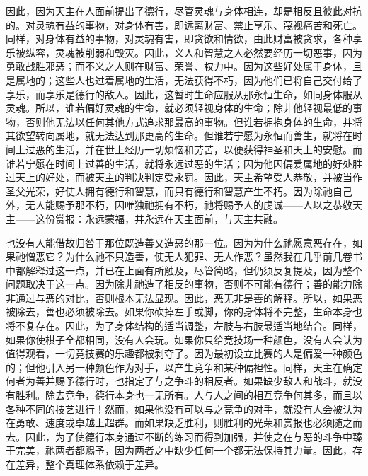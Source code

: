 因此，因为天主在人面前提出了德行，尽管灵魂与身体相连，却是相反且彼此对抗的。对灵魂有益的事物，对身体有害，即远离财富、禁止享乐、蔑视痛苦和死亡。同样，对身体有益的事物，对灵魂有害，即贪欲和情欲，由此财富被贪求，各种享乐被纵容，灵魂被削弱和毁灭。因此，义人和智慧之人必然要经历一切恶事，因为勇敢战胜邪恶；而不义之人则在财富、荣誉、权力中。因为这些好处属于身体，且是属地的；这些人也过着属地的生活，无法获得不朽，因为他们已将自己交付给了享乐，而享乐是德行的敌人。因此，这暂时生命应服从那永恒生命，如同身体服从灵魂。所以，谁若偏好灵魂的生命，就必须轻视身体的生命；除非他轻视最低的事物，否则他无法以任何其他方式追求那最高的事物。但谁若拥抱身体的生命，并将其欲望转向属地，就无法达到那更高的生命。但谁若宁愿为永恒而善生，就将在时间上过恶的生活，并在世上经历一切烦恼和劳苦，以便获得神圣和天上的安慰。而谁若宁愿在时间上过善的生活，就将永远过恶的生活；因为他因偏爱属地的好处胜过天上的好处，而被天主的判决判定受永罚。因此，天主希望受人恭敬，并被当作圣父光荣，好使人拥有德行和智慧，而只有德行和智慧产生不朽。因为除祂自己外，无人能赐予那不朽，因唯独祂拥有不朽，祂将赐予人的虔诚——人以之恭敬天主——这份赏报：永远蒙福，并永远在天主面前，与天主共融。\par

\par

也没有人能借故归咎于那位既造善又造恶的那一位。因为为什么祂愿意恶存在，如果祂憎恶它？为什么祂不只造善，使无人犯罪、无人作恶？虽然我在几乎前几卷书中都解释过这一点，并已在上面有所触及，尽管简略，但仍须反复提及，因为整个问题取决于这一点。因为除非祂造了相反的事物，否则不可能有德行；善的能力除非通过与恶的对比，否则根本无法显现。因此，恶无非是善的解释。所以，如果恶被除去，善也必须被除去。如果你砍掉左手或脚，你的身体将不完整，生命本身也将不复存在。因此，为了身体结构的适当调整，左肢与右肢最适当地结合。同样，如果你使棋子全都相同，没有人会玩。如果你只给竞技场一种颜色，没有人会认为值得观看，一切竞技赛的乐趣都被剥夺了。因为最初设立比赛的人是偏爱一种颜色的；但他引入另一种颜色作为对手，以产生竞争和某种偏袒性。同样，天主在确定何者为善并赐予德行时，也指定了与之争斗的相反者。如果缺少敌人和战斗，就没有胜利。除去竞争，德行本身也一无所有。人与人之间的相互竞争何其多，而且以各种不同的技艺进行！然而，如果他没有可以与之竞争的对手，就没有人会被认为在勇敢、速度或卓越上超群。而如果缺乏胜利，则胜利的光荣和赏报也必须随之而去。因此，为了使德行本身通过不断的练习而得到加强，并使之在与恶的斗争中臻于完美，祂两者都赐予，因为两者之中缺少任何一个都无法保持其力量。因此，存在差异，整个真理体系依赖于差异。\par

